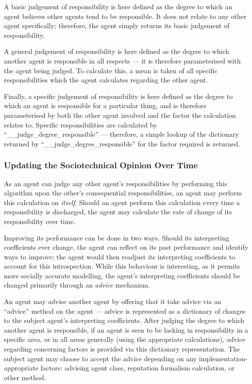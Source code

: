 A basic judgement of responsibility is here defined as the degree to which an agent believes other agents tend to be responsible. It does not relate to any other agent specifically; therefore, the agent simply returns its basic judgement of responsibility.\par

A general judgement of responsibility is here defined as the degree to which another agent is responsible in all respects --- it is therefore parameterised with the agent being judged. To calculate this, a mean is taken of all specific responsibilities which the agent calculates regarding the other agent.\par

Finally, a specific judgement of responsibility is here defined as the degree to which an agent is responsible for a particular thing, and is therefore parameterised by both the other agent involved and the factor the calculation relates to. Specific responsibilities are calculated by\\``\_\_judge\_degree\_responsible'' --- therefore, a simple lookup of the dictionary returned by ``\_\_judge\_degree\_responsible'' for the factor required is returned.

\subsubsection{Updating the Sociotechnical Opinion Over Time}
As an agent can judge any other agent's responsibilities by performing this algorithm upon the other's consequential responsibilities, an agent may perform this calculation on \emph{itself}. Should an agent perform this calculation every time a responsibility is discharged, the agent may calculate the rate of change of its responsibility over time.\par

Improving its performance can be done in two ways. Should its interpreting coefficients ever change, the agent can reflect on its past performance and identify ways to improve; the agent would then readjust its interpreting coefficients to account for this introspection. While this behaviour is interesting, as it permits more socially accurate modelling, the agent's interpreting coefficients should be changed primarily through an \emph{advice} mechanism.\par

An agent may advise another agent by offering that it take advice via an ``advice'' method on the agent --- advice is represented as a dictionary of changes to the subject agent's interpreting coefficients. After judging the degree to which another agent is responsible, if an agent is seen to be lacking in responsibility in a specific area, or in all areas generally (using the appropriate calculations), advice regarding concerning factors is provided via this dictionary representation. The subject agent may choose to accept the advice depending on any implementation-appropriate factors: advising agent class, reputation formalism calculation, or other method.\par

